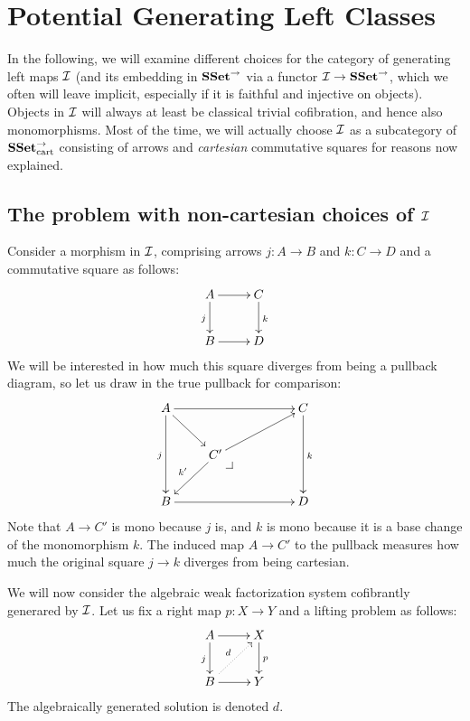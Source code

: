\documentclass[reqno,10pt,a4paper,oneside]{amsart}
\begin{document}
\section*{Potential Generating Left Classes}

In the following, we will examine different choices for the category of generating left maps $\cal{I}$ (and its embedding in $\SSet^{\to}$ via a functor $\cal{I} \to \SSet^{\to}$, which we often will leave implicit, especially if it is faithful and injective on objects).
Objects in $\cal{I}$ will always at least be classical trivial cofibration, and hence also monomorphisms.
Most of the time, we will actually choose $\cal{I}$ as a subcategory of $\SSet_{\text{cart}}^{\to}$ consisting of arrows and \emph{cartesian} commutative squares for reasons now explained.

\subsection*{The problem with non-cartesian choices of $\cal{I}$}

Consider a morphism in $\cal{I}$, comprising arrows $j : A \to B$ and $k : C \to D$ and a commutative square as follows:
\begin{equation}
\label{eq:problem-non-cartesian-0}
\begin{gathered}
\xymatrix{
  A
  \ar[r]
  \ar[d]_{j}
&
  C
  \ar[d]^{k}
\\
  B
  \ar[r]
&
  D
}
\end{gathered}
\end{equation}
We will be interested in how much this square diverges from being a pullback diagram, so let us draw in the true pullback for comparison:
\begin{equation}
\label{eq:problem-non-cartesian-1}
\begin{gathered}
\xymatrix{
  A
  \ar[rrr]
  \ar[dd]_{j}
  \ar[dr]
&&&
  C
  \ar[dd]^{k}
\\&
  C'
  \ar[urr]
  \ar[dl]_{k'}
  \pullback{dr}
\\
  B
  \ar[rrr]
&&&
  D
}
\end{gathered}
\end{equation}
Note that $A \to C'$ is mono because $j$ is, and $k$ is mono because it is a base change of the monomorphism $k$.
The induced map $A \to C'$ to the pullback measures how much the original square $j \to k$ diverges from being cartesian.

We will now consider the algebraic weak factorization system cofibrantly generared by $\cal{I}$.
Let us fix a right map $p : X \to Y$ and a lifting problem as follows:
\[
\xymatrix{
  A
  \ar[r]
  \ar[d]_{j}
&
  X
  \ar[d]^{p}
\\
  B
  \ar[r]
  \ar@{.>}[ur]^{d}
&
  Y
}
\]
The algebraically generated solution is denoted $d$.
\end{document}
